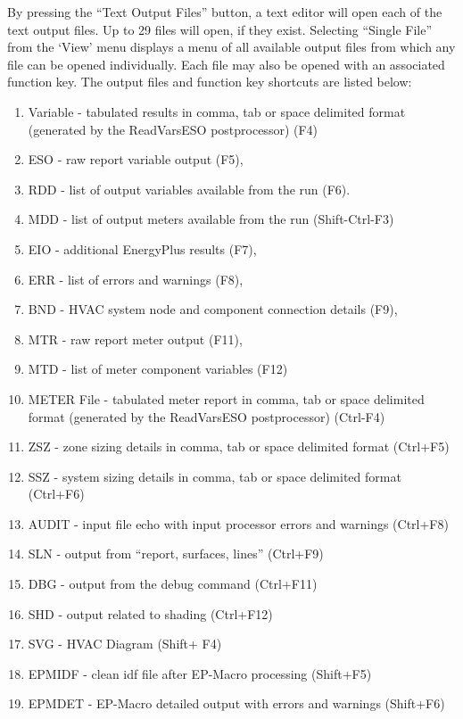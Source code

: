By pressing the ``Text Output Files'' button, a text editor will open each of the text output files. Up to 29 files will open, if they exist. Selecting ``Single File'' from the `View' menu displays a menu of all available output files from which any file can be opened individually. Each file may also be opened with an associated function key. The output files and function key shortcuts are listed below:

\begin{enumerate}
\def\labelenumi{\arabic{enumi}.}
\item
  Variable - tabulated results in comma, tab or space delimited format (generated by the ReadVarsESO postprocessor) (F4)
\item
  ESO - raw report variable output (F5),
\item
  RDD - list of output variables available from the run (F6).
\item
  MDD - list of output meters available from the run (Shift-Ctrl-F3)
\item
  EIO - additional EnergyPlus results (F7),
\item
  ERR - list of errors and warnings (F8),
\item
  BND - HVAC system node and component connection details (F9),
\item
  MTR - raw report meter output (F11),
\item
  MTD - list of meter component variables (F12)
\item
  METER File - tabulated meter report in comma, tab or space delimited format (generated by the ReadVarsESO postprocessor) (Ctrl-F4)
\item
  ZSZ - zone sizing details in comma, tab or space delimited format (Ctrl+F5)
\item
  SSZ - system sizing details in comma, tab or space delimited format (Ctrl+F6)
\item
  AUDIT - input file echo with input processor errors and warnings (Ctrl+F8)
\item
  SLN - output from ``report, surfaces, lines'' (Ctrl+F9)
\item
  DBG - output from the debug command (Ctrl+F11)
\item
  SHD - output related to shading (Ctrl+F12)
\item
  SVG - HVAC Diagram (Shift+ F4)
\item
  EPMIDF - clean idf file after EP-Macro processing (Shift+F5)
\item
  EPMDET - EP-Macro detailed output with errors and warnings (Shift+F6)

\end{enumerate}
